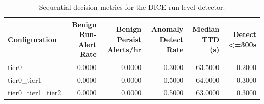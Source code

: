 \begin{table}[t]
\centering
\caption{Sequential decision metrics for the DICE run-level detector.}
\label{tab:dice_sequential_metrics}
\footnotesize
\begin{tabular}{lrrrrr}
\toprule
Configuration & Benign Run-Alert Rate & Benign Persist Alerts/hr & Anomaly Detect Rate & Median TTD (s) & Detect <=300s \\
\midrule
tier0 & 0.0000 & 0.0000 & 0.3000 & 63.5000 & 0.2000 \\
tier0_tier1 & 0.0000 & 0.0000 & 0.5000 & 64.0000 & 0.3000 \\
tier0_tier1_tier2 & 0.0000 & 0.0000 & 0.5000 & 63.0000 & 0.3000 \\
\bottomrule
\end{tabular}

\end{table}
